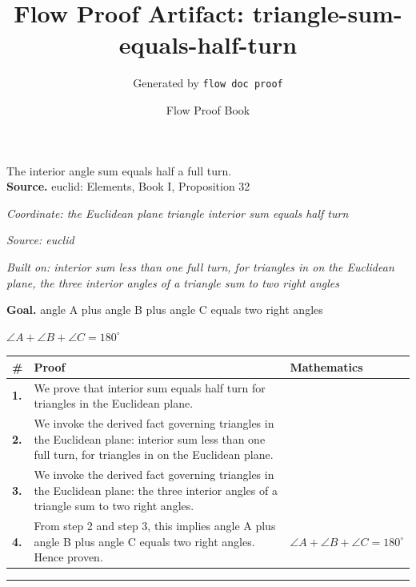 \documentclass[11pt]{article}
\title{Flow Proof Artifact: triangle-sum-equals-half-turn}
\author{Generated by \texttt{flow doc proof}}
\date{Flow Proof Book}
\theoremstyle{definition}
\begin{document}
\maketitle
The interior angle sum equals half a full turn.\\[0.5em]
\textbf{Source.} euclid: Elements, Book I, Proposition 32\\[0.5em]
\bigskip
{}\par
\smallskip\noindent\textit{Coordinate: the Euclidean plane \cdot triangle \cdot interior sum equals half turn}\par
\smallskip\noindent\textit{Source: euclid}\par
\smallskip\noindent\textit{Built on: interior sum less than one full turn, for triangles in on the Euclidean plane, the three interior angles of a triangle sum to two right angles}\par
\medskip
\noindent\textbf{Goal.} angle A plus angle B plus angle C equals two right angles\par
\noindent$\displaystyle \angle A + \angle B + \angle C = 180^\circ$\par
\medskip
\noindent
\begin{tabular}{@{} >{\raggedright\arraybackslash}p{} >{\raggedright\arraybackslash}p{} >{\raggedleft\arraybackslash}p{} @{}}
\textbf{\#} & \textbf{Proof} & \textbf{Mathematics} \\
\midrule
\textbf{1.} & We prove that interior sum equals half turn for triangles in the Euclidean plane. & \\[0.45em]
\textbf{2.} & We invoke the derived fact governing triangles in the Euclidean plane: interior sum less than one full turn, for triangles in on the Euclidean plane. & \\[0.45em]
\textbf{3.} & We invoke the derived fact governing triangles in the Euclidean plane: the three interior angles of a triangle sum to two right angles. & \\[0.45em]
\textbf{4.} & From step 2 and step 3, this implies angle A plus angle B plus angle C equals two right angles. Hence proven. & $\displaystyle \angle A + \angle B + \angle C = 180^\circ$ \\[0.45em]
\bottomrule
\end{tabular}
\label{thm:Geometry-triangle-interior_sum_equals_half_turn}
\par\medskip\hrule
\end{document}

